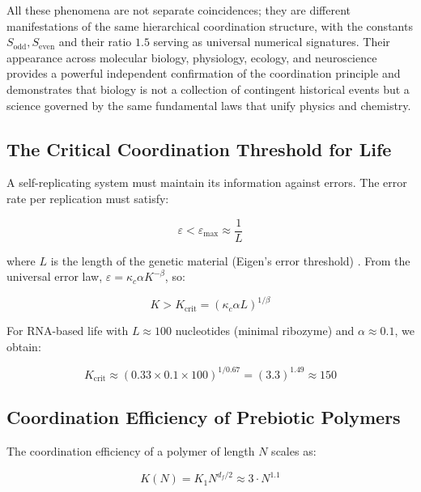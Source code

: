 \documentclass[12pt,a4paper]{article}
\theoremstyle{remark}
\newcommand{\kappac}{\kappa_c}
\newcommand{\eps}{\varepsilon}
\newcommand{\df}{d_{\!f}}
\begin{document}
	All these phenomena are not separate coincidences; they are different manifestations of the same hierarchical coordination structure, with the constants \(S_{\mathrm{odd}}, S_{\mathrm{even}}\) and their ratio \(1.5\) serving as universal numerical signatures. Their appearance across molecular biology, physiology, ecology, and neuroscience provides a powerful independent confirmation of the coordination principle and demonstrates that biology is not a collection of contingent historical events but a science governed by the same fundamental laws that unify physics and chemistry.
	
	\subsection{The Critical Coordination Threshold for Life}
	
	A self-replicating system must maintain its information against errors. The error rate per replication must satisfy:
	
	\begin{equation}
		\eps < \eps_{\text{max}} \approx \frac{1}{L}
		\label{eq:error-threshold}
	\end{equation}
	
	where $L$ is the length of the genetic material (Eigen's error threshold) \cite{Eigen1971}. From the universal error law, $\eps = \kappac \alpha K^{-\beta}$, so:
	
	\begin{equation}
		K > K_{\text{crit}} = \left( \kappac \alpha L \right)^{1/\beta}
		\label{eq:Kcrit-life}
	\end{equation}
	
	For RNA-based life with $L \approx 100$ nucleotides (minimal ribozyme) and $\alpha \approx 0.1$, we obtain:
	
	\begin{equation}
		K_{\text{crit}} \approx (0.33 \times 0.1 \times 100)^{1/0.67} = (3.3)^{1.49} \approx 150
		\label{eq:Kcrit-life-num}
	\end{equation}
	
	\subsection{Coordination Efficiency of Prebiotic Polymers}
	
	The coordination efficiency of a polymer of length $N$ scales as:
	
	\begin{equation}
		K(N) = K_1 N^{\df/2} \approx 3 \cdot N^{1.1}
		\label{eq:K-polymer}
	\end{equation}
	
\end{document}
